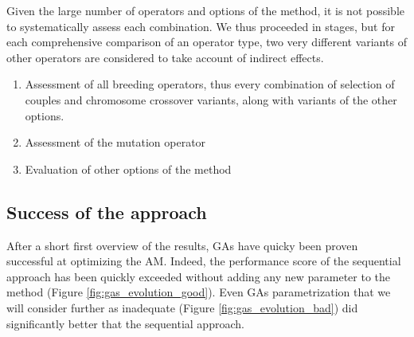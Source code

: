 \documentclass[twocol]{ametsoc}
\begin{document}
Given the large number of operators and options of the method, it is not possible to systematically assess each combination. We thus proceeded in stages, but for each comprehensive comparison of an operator type, two very different variants of other operators are considered to take account of indirect effects.

\begin{enumerate}
	\item Assessment of all breeding operators, thus every combination of selection of couples and chromosome crossover variants, along with variants of the other options.
	\item Assessment of the mutation operator
	\item Evaluation of other options of the method
\end{enumerate}


\subsection{Success of the approach}

After a short first overview of the results, GAs have quicky been proven successful at optimizing the AM. Indeed, the performance score of the sequential approach has been quickly exceeded without adding any new parameter to the method (Figure \ref{fig:gas_evolution_good}). Even GAs parametrization that we will consider further as inadequate (Figure \ref{fig:gas_evolution_bad}) did significantly better that the sequential approach.
\end{document}
